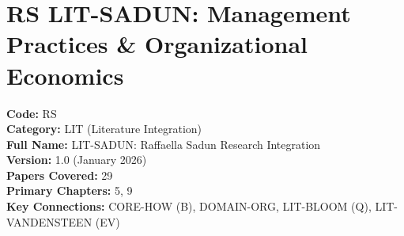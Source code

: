 %
%

\chapter{RS LIT-SADUN: Management Practices \& Organizational Economics}
\label{app:lit-sadun}

\begin{tcolorbox}[colback=blue!5!white, colframe=blue!75!black, title=Appendix Metadata]
\textbf{Code:} RS \\
\textbf{Category:} LIT (Literature Integration) \\
\textbf{Full Name:} LIT-SADUN: Raffaella Sadun Research Integration \\
\textbf{Version:} 1.0 (January 2026) \\
\textbf{Papers Covered:} 29 \\
\textbf{Primary Chapters:} 5, 9 \\
\textbf{Key Connections:} CORE-HOW (B), DOMAIN-ORG, LIT-BLOOM (Q), LIT-VANDENSTEEN (EV)
\end{tcolorbox}

